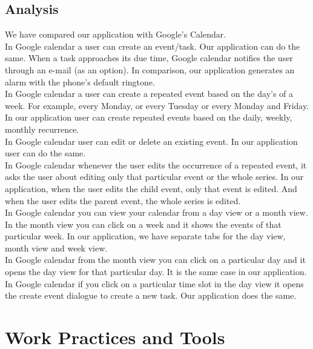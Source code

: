 \documentclass[10pt,a4paper]{report}
\begin{document}
\section{Analysis}

We have compared our application with Google's Calendar.\\

In Google calendar a user can create an event/task. Our application can do the same.
When a task approaches its due time, Google calendar notifies the user through an e-mail (as an option). In comparison, our application generates an alarm with the phone's default ringtone. \\

In Google calendar a user can create a repeated event based on the day's of a week. For example, every Monday, or every Tuesday or every Monday and Friday. In our application user can create repeated events based on the daily, weekly, monthly recurrence. \\

In Google calendar user can edit or delete an existing event. In our application user can do the same.\\

In Google calendar whenever the user edits the occurrence of a repeated event, it asks the user about editing only that particular event or the whole series. In our application, when the user edits the child event, only that event is edited. And when the user edits the parent event, the whole series is edited. \\

In Google calendar you can view your calendar from a day view or a month view. In the month view you can click on a week and it shows the events of that particular week. In our application, we have separate tabs for the day view, month view and week view.\\

In Google calendar from the month view you can click on a particular day and it opens the day view for that particular day. It is the same case in our application. \\

In Google calendar if you click on a particular time slot in the day view it opens the create event dialogue to create a new task. Our application does the same.

\chapter{Work Practices and Tools}
\end{document}

